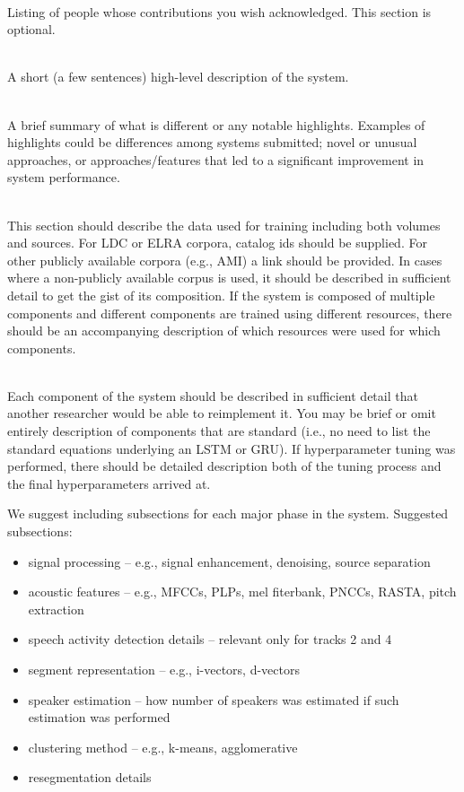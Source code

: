 \documentclass{article}
\begin{document}
\begin{appendices}
\vspace{0.5cm}
 \\
Listing of people whose contributions you wish acknowledged. This section is optional.

\vspace{0.5cm}
 \\
A short (a few sentences) high-level description of the system.

\vspace{0.5cm}
 \\
A brief summary of what is different or any notable highlights. Examples of highlights could be differences among systems submitted; novel or unusual approaches, or approaches/features that led to a significant improvement in system performance.


\vspace{0.5cm}
 \\
This section should describe the data used for training including both volumes and sources. For LDC or ELRA corpora, catalog ids should be supplied. For other publicly available corpora (e.g., AMI) a link should be provided. In cases where a non-publicly available corpus is used, it should be described in sufficient detail to get the gist of its composition. If the system is composed of multiple components and different components are trained using different resources, there should be an accompanying description of which resources were used for which components.

\vspace{0.5cm}
 \\
Each component of the system should be described in sufficient detail that another researcher would be able to reimplement it. You may be brief or omit entirely description of components that are standard (i.e., no need to list the standard equations underlying an LSTM or GRU). If hyperparameter tuning was performed, there should be detailed description both of the tuning process and the final hyperparameters arrived at.

We suggest including subsections for each major phase in the system. Suggested subsections:
\begin{itemize}
    \item signal processing  --  e.g., signal enhancement, denoising, source separation
    \item acoustic features  --  e.g., MFCCs, PLPs, mel fiterbank, PNCCs, RASTA, pitch extraction
    \item speech activity detection details  --  relevant only for tracks 2 and 4
    \item segment representation  --  e.g., i-vectors, d-vectors
    \item speaker estimation  --  how number of speakers was estimated if such estimation was performed
    \item clustering method  --  e.g., k-means, agglomerative
    \item resegmentation details
\end{itemize}



\end{appendices}
\end{document}
